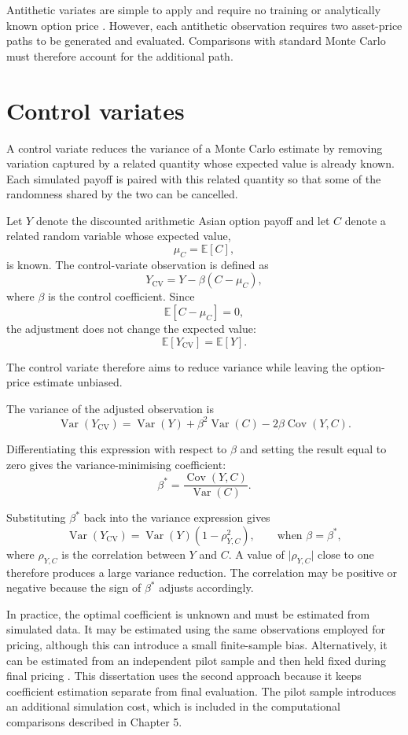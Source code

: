 Antithetic variates are simple to apply and require no training or analytically known option price \parencite{hammersley1956,glasserman2004}. However, each antithetic observation requires two asset-price paths to be generated and evaluated. Comparisons with standard Monte Carlo must therefore account for the additional path.

\section{Control variates}

A control variate reduces the variance of a Monte Carlo estimate by removing variation captured by a related quantity whose expected value is already known. Each simulated payoff is paired with this related quantity so that some of the randomness shared by the two can be cancelled.

Let \(Y\) denote the discounted arithmetic Asian option payoff and let \(C\) denote a related random variable whose expected value,
\[
\mu_C
=
\mathbb{E}[C],
\]
is known. The control-variate observation is defined as
\[
Y_{\mathrm{CV}}
=
Y-\beta(C-\mu_C),
\]
where \(\beta\) is the control coefficient. Since
\[
\mathbb{E}[C-\mu_C]=0,
\]
the adjustment does not change the expected value:
\[
\mathbb{E}
\left[
Y_{\mathrm{CV}}
\right]
=
\mathbb{E}[Y].
\]

The control variate therefore aims to reduce variance while leaving the option-price estimate unbiased.

The variance of the adjusted observation is
\[
\operatorname{Var}
\left(
Y_{\mathrm{CV}}
\right)
=
\operatorname{Var}(Y)
+
\beta^2\operatorname{Var}(C)
-
2\beta\operatorname{Cov}(Y,C).
\]

Differentiating this expression with respect to \(\beta\) and setting the result equal to zero gives the variance-minimising coefficient:
\[
\beta^*
=
\frac{\operatorname{Cov}(Y,C)}
{\operatorname{Var}(C)}.
\]

Substituting \(\beta^*\) back into the variance expression gives
\[
\operatorname{Var}
\left(
Y_{\mathrm{CV}}
\right)
=
\operatorname{Var}(Y)
\left(
1-\rho_{Y,C}^{2}
\right),
\qquad
\text{when } \beta=\beta^*,
\]
where \(\rho_{Y,C}\) is the correlation between \(Y\) and \(C\). A value of \(\lvert\rho_{Y,C}\rvert\) close to one therefore produces a large variance reduction. The correlation may be positive or negative because the sign of \(\beta^*\) adjusts accordingly.

In practice, the optimal coefficient is unknown and must be estimated from simulated data. It may be estimated using the same observations employed for pricing, although this can introduce a small finite-sample bias. Alternatively, it can be estimated from an independent pilot sample and then held fixed during final pricing \parencite{glasserman2004}. This dissertation uses the second approach because it keeps coefficient estimation separate from final evaluation. The pilot sample introduces an additional simulation cost, which is included in the computational comparisons described in Chapter 5.

